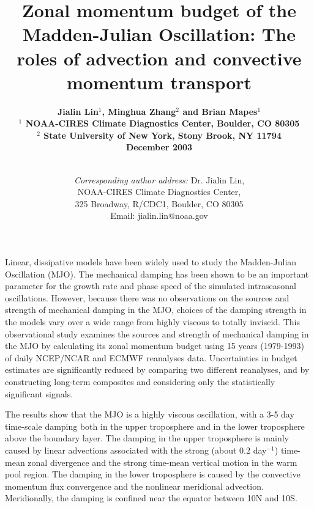 \documentclass[12pt]{article}
\begin{document}
\title{\Large \bf 
Zonal momentum budget of the Madden-Julian Oscillation:
The roles of advection and convective momentum transport
}

\author{\bf Jialin Lin$^{1}$, Minghua Zhang$^{2}$ and Brian Mapes$^{1}$\\ 
\bf
$^{1}$ NOAA-CIRES Climate Diagnostics Center, Boulder, CO 80305\\
\bf
$^{2}$ State University of New York, Stony Brook, NY 11794\\
December 2003\\
\vspace*{2.5in}\\
}
\date{
{\it Corresponding author address:} Dr. Jialin Lin,\\
NOAA-CIRES Climate Diagnostics Center,\\
325 Broadway, R/CDC1, Boulder, CO 80305\\
Email: jialin.lin@noaa.gov
}
\maketitle

\newpage

\topmargin -0.1in
\setlength{\baselineskip}{24pt}
\setlength{\baselineskip}{30pt}

\hspace*{2.0in}

  Linear, dissipative models have been widely used to study the 
Madden-Julian Oscillation (MJO). The mechanical damping has been shown to
be an important parameter for the growth rate and phase speed of the
simulated intraseasonal oscillations.
However, because there was no observations on the sources and strength 
of mechanical damping in the MJO, choices of the damping strength
in the models vary over a wide range from highly viscous 
to totally inviscid.
This observational study examines the sources and strength of mechanical 
damping in the MJO by calculating its zonal momentum budget using 
15 years (1979-1993) of daily NCEP/NCAR and ECMWF reanalyses data.
Uncertainties in budget estimates are significantly reduced by comparing
two different reanalyses, and by constructing long-term composites and
considering only the statistically significant signals.

The results show that the MJO is a highly viscous oscillation, with
a 3-5 day time-scale damping both in the upper troposphere 
and in the lower troposphere above the boundary layer.
The damping in the upper troposphere is mainly caused by linear advections
associated with the strong (about 0.2 day$^{-1}$) time-mean zonal divergence 
and the strong time-mean vertical motion in the warm pool region.
The damping in the lower troposphere is caused by the convective momentum
flux convergence and the nonlinear meridional advection.
Meridionally, the damping is confined near the equator between 10N and 10S.
\end{document}

